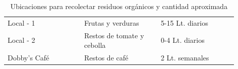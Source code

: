 \begin{table}\centering
    \caption{Ubicaciones para recolectar residuos orgánicos y cantidad aproximada}
    \label{tab:ubicaciones_para_contenedores}
    {\tabstyle
    \begin{tabular}{M{0.3\linewidth}M{0.3\linewidth}M{0.3\linewidth}}\hline
         &  &  \\ \hline

        Local - 1    & Frutas y verduras & 5-15 Lt. diarios         \\
        Local - 2    & Restos de tomate y cebolla & 0-4 Lt. diarios \\
        Dobby’s Café & Restos de café  & 2 Lt. semanales            \\

    \hline\end{tabular}}
\end{table}